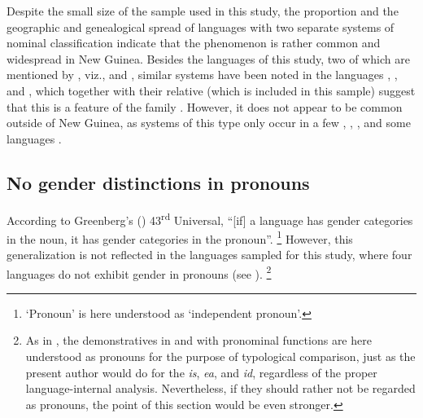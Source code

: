 \documentclass[output=collectionpaper]{langsci/langscibook}
\begin{document}
Despite the small size of the sample used in this study, the proportion and the geographic and genealogical spread of languages with two separate systems of nominal classification indicate that the phenomenon is rather common and widespread in New Guinea. Besides the languages of this study, two of which are mentioned by \citet[373]{Foley2000}, viz.,  and , similar systems have been noted in the  languages , , and , which together with their relative  (which is included in this sample) suggest that this is a feature of the  family \citep[46]{Lock2011}. However, it does not appear to be common outside of New Guinea, as systems of this type only occur in a few , , , and some  languages \citep[185]{Aikhenvald2008}.


\subsection{No gender distinctions in pronouns}


According to Greenberg's (\citeyear[90]{Greenberg1963}) 43\textsuperscript{rd} Universal, ``[if] a language has gender categories in the noun, it has gender categories in the pronoun''.%
\footnote{`Pronoun' is here understood as `independent pronoun'.} %
However, this generalization is not reflected in the languages sampled for this study, where four languages do not exhibit gender in pronouns (see ).%
\footnote{%
\label{fn:Svard:19}
As in , the demonstratives in  and  with pronominal functions are here understood as pronouns for the purpose of typological comparison, just as the present author would do for the  \textit{is}, \textit{ea}, and \textit{id}, regardless of the proper language-internal analysis. Nevertheless, if they should rather not be regarded as pronouns, the point of this section would be even stronger.
}%
\end{document}
